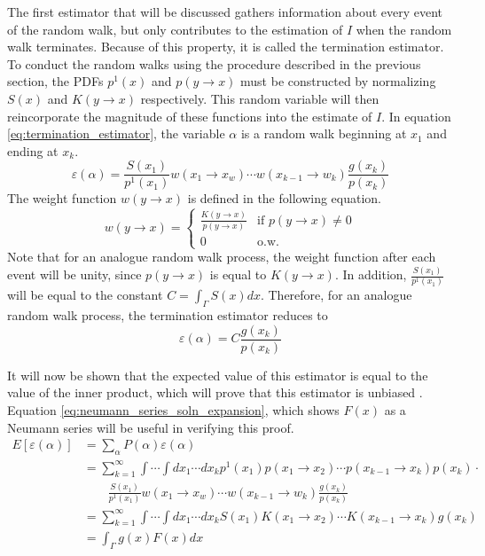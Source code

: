 The first estimator that will be discussed gathers information about every
event of the random walk, but only contributes to the estimation of $I$ when
the random walk terminates. Because of this property, it is called the
termination estimator. To conduct the random walks using the procedure
described in the previous section, the PDFs $p^1(x)$ and $p(y \to x)$ must be 
constructed by normalizing $S(x)$ and $K(y \to x)$ respectively. This random
variable will then reincorporate the magnitude of these functions into
the estimate of $I$. In equation \ref{eq:termination_estimator}, the variable 
$\alpha$ is a random walk beginning at $x_1$ and ending at $x_k$.
\begin{equation}
  \varepsilon(\alpha) = \frac{S(x_1)}{p^1(x_1)}w(x_1 \to x_w)\cdots 
  w(x_{k-1} \to w_k)\frac{g(x_k)}{p(x_k)}
  \label{eq:termination_estimator}
\end{equation}
The weight function $w(y \to x)$ is defined in the following equation.
\begin{equation}
  w(y \to x) = 
  \begin{cases}
    \frac{K(y \to x)}{p(y \to x)} & \text{if } p(y \to x) \neq 0 \\
    0 & \text{o.w.}
  \end{cases}
\end{equation}
Note that for an analogue random walk process, the weight function after each
event will be unity, since $p(y \to x)$ is equal to $K(y \to x)$. In addition,
$\frac{S(x_1)}{p^1(x_1)}$ will be equal to the constant 
$C = \int_{\Gamma} S(x)dx$. Therefore, for an analogue random walk process, the
termination estimator reduces to
\begin{equation*}
  \varepsilon(\alpha) = C \frac{g(x_k)}{p(x_k)}
\end{equation*}

It will now be shown that the expected value of this estimator is equal to the 
value of the inner product, which will prove that this estimator is unbiased 
\citep{spanier_monte_1969}. Equation \ref{eq:neumann_series_soln_expansion},
which shows $F(x)$ as a Neumann series will be useful in verifying this proof.
\begin{align}
  E\left[\varepsilon(\alpha)\right] & = \sum_{\alpha} 
  P(\alpha)\varepsilon(\alpha) \nonumber \\
  & = \sum_{k=1}^{\infty} \int \cdots \int dx_1 \cdots dx_k p^1(x_1)
  p(x_1 \to x_2) \cdots p(x_{k-1} \to x_k)p(x_k) \cdot \nonumber \\
  & \qquad \frac{S(x_1)}{p^1(x_1)}w(x_1 \to x_w)\cdots 
  w(x_{k-1} \to w_k)\frac{g(x_k)}{p(x_k)} \nonumber \\
  & = \sum_{k=1}^{\infty} \int \cdots \int dx_1 \cdots dx_k S(x_1)K(x_1 \to x_2)
  \cdots K(x_{k-1} \to x_k)g(x_k) \nonumber \\
  & = \int_{\Gamma} g(x)F(x)dx \nonumber  
\end{align}

